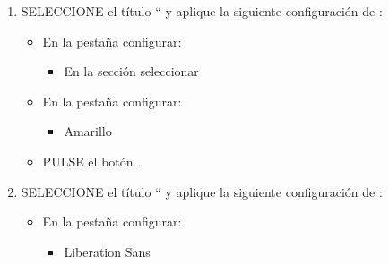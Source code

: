 \documentclass[letterpaper,10pt,spanish]{sphinxmanual}
\begin{document}
\begin{enumerate}
\begin{itemize}
\begin{itemize}
\begin{itemize}
\end{itemize}

\item {} 
\sphinxAtStartPar
En la sección  configurar:
\begin{itemize}
\item {} 
\sphinxAtStartPar
{} de 

\end{itemize}

\end{itemize}

\item {} 
\sphinxAtStartPar
PULSE el botón 

\end{itemize}

\item {} 
\sphinxAtStartPar
SELECCIONE el título “ y aplique la siguiente configuración de :
\begin{itemize}
\item {} 
\sphinxAtStartPar
En la pestaña  configurar:
\begin{itemize}
\item {} 
\sphinxAtStartPar
En la sección  seleccionar 

\end{itemize}

\item {} 
\sphinxAtStartPar
En la pestaña  configurar:
\begin{itemize}
\item {} 
\sphinxAtStartPar
{} Amarillo

\end{itemize}

\item {} 
\sphinxAtStartPar
PULSE el botón .

\end{itemize}

\item {} 
\sphinxAtStartPar
SELECCIONE el título “ y aplique la siguiente configuración de :
\begin{itemize}
\item {} 
\sphinxAtStartPar
En la pestaña  configurar:
\begin{itemize}
\item {} 
\sphinxAtStartPar
{} Liberation Sans


\end{itemize}
\end{itemize}
\end{enumerate}
\end{document}
